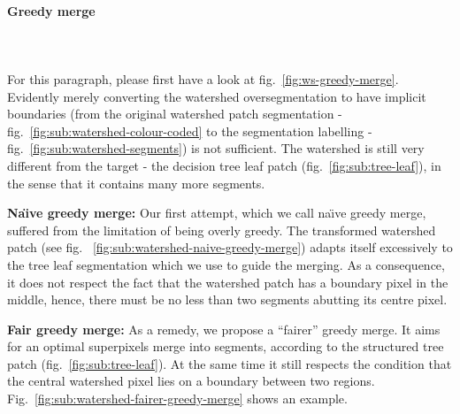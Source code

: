 \paragraph{Greedy merge}\mbox{}\\\mbox{}\\ %
For this paragraph, please first have a look at fig.~\ref{fig:ws-greedy-merge}. Evidently merely converting the watershed oversegmentation to have implicit boundaries (from the original watershed patch segmentation - fig.~\ref{fig:sub:watershed-colour-coded} to the segmentation labelling - fig.~\ref{fig:sub:watershed-segments}) is not sufficient. The watershed is still very different from the target - the decision tree leaf patch (fig.~\ref{fig:sub:tree-leaf}), in the sense that it contains many more segments.

\textbf{Na\"{\i}ve greedy merge:} Our first attempt, which we call na\"{\i}ve greedy merge, suffered from the limitation of being overly 
greedy. The transformed watershed patch (see fig.
~\ref{fig:sub:watershed-naive-greedy-merge}) adapts itself excessively to the tree leaf segmentation which we use to guide the merging. As a consequence, it does not respect the fact that the watershed patch has a boundary pixel in the middle, hence, there must be no less than two segments abutting its centre pixel.

\textbf{Fair greedy merge:} As a remedy, we propose a ``fairer'' greedy merge. It %
aims for an optimal superpixels merge into segments, according to the structured tree patch (fig.~\ref{fig:sub:tree-leaf}). At the same time it still respects the condition that the central watershed pixel lies on a boundary between two regions. Fig.~\ref{fig:sub:watershed-fairer-greedy-merge} shows an example.

